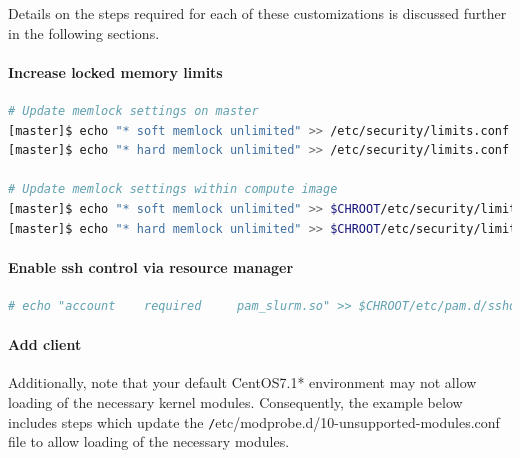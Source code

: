 \documentclass[letterpaper]{article}
\newcommand{\baseOS}{CentOS7.1*}
\begin{document}
\noindent Details on the steps required for each of these customizations is
discussed further in the following sections.

\paragraph{Increase locked memory limits}

 

\begin{lstlisting}[language=bash,keywords={},upquote=true]
# Update memlock settings on master
[master]$ echo "* soft memlock unlimited" >> /etc/security/limits.conf
[master]$ echo "* hard memlock unlimited" >> /etc/security/limits.conf

# Update memlock settings within compute image
[master]$ echo "* soft memlock unlimited" >> $CHROOT/etc/security/limits.conf
[master]$ echo "* hard memlock unlimited" >> $CHROOT/etc/security/limits.conf
\end{lstlisting}


\paragraph{Enable ssh control via resource manager} 



\begin{lstlisting}[language=bash,keywords={},upquote=true]
# echo "account    required     pam_slurm.so" >> $CHROOT/etc/pam.d/sshd
\end{lstlisting}

\paragraph{Add \Lustre{} client} \label{sec:lustre_client}


Additionally, note that your default \baseOS{} environment may not allow loading of
the necessary \Lustre{} kernel modules. Consequently, the example below includes
steps which update the {\texttt /etc/modprobe.d/10-unsupported-modules.conf}
file to allow loading of the necessary modules.
\end{document}
